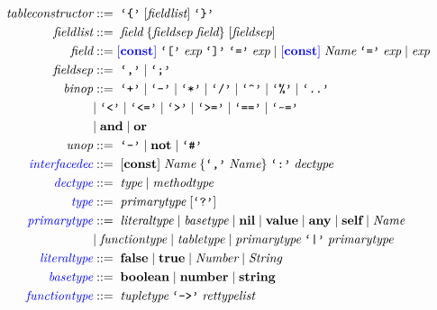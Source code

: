 \begin{align*}
\textit{tableconstructor} & ::= \; \texttt{`\{'} \; [\textit{fieldlist}] \; \texttt{`\}'}\\
\textit{fieldlist} & ::= \; \textit{field} \; \{\textit{fieldsep} \; \textit{field}\} \; [\textit{fieldsep}]\\
\textit{field} & ::= \textcolor{blue}{[\textbf{const}]} \; \texttt{`['} \; \textit{exp} \; \texttt{`]'} \; \texttt{`='} \; \textit{exp} \; | \;
  \textcolor{blue}{[\textbf{const}]} \; \textit{Name} \; \texttt{`='} \; \textit{exp} \; | \;
  \textit{exp}\\
\textit{fieldsep} & ::= \; \texttt{`,'} \; | \; \texttt{`;'}\\
\textit{binop} & ::= \; \texttt{`+'} \; | \; \texttt{`-'} \; | \; \texttt{`*'} \; | \; \texttt{`/'} \; | \;
  \texttt{`\textasciicircum'} \; | \; \texttt{`\%'} \; | \; \texttt{`..'}\\
& | \; \texttt{`<'} \; | \; \texttt{`<='} \; | \; \texttt{`>'} \; | \; \texttt{`>='} \; | \;
  \texttt{`=='} \; | \; \texttt{`\textasciitilde='}\\
& | \; \textbf{and} \; | \; \textbf{or}\\
\textit{unop} & ::= \; \texttt{`-'} \; | \; \textbf{not} \; | \; \texttt{`\#'}\\
\textcolor{blue}{\textit{interfacedec}} & ::= \; [\textbf{const}] \; \textit{Name} \; \{\texttt{`,'} \; \textit{Name}\} \; \texttt{`:'} \; \textit{dectype}\\
\textcolor{blue}{\textit{dectype}} & ::= \; \textit{type} \; | \; \textit{methodtype}\\
\textcolor{blue}{\textit{type}} & ::= \; \textit{primarytype} \; [\texttt{`?'}]\\
\textcolor{blue}{\textit{primarytype}} & ::= \; \textit{literaltype} \; | \;
  \textit{basetype} \; | \;
  \textbf{nil} \; | \;
  \textbf{value} \; | \;
  \textbf{any} \; | \;
  \textbf{self} \; | \;
  \textit{Name}\\
& | \; \textit{functiontype} \; | \;
  \textit{tabletype} \; | \;
  \textit{primarytype} \; \texttt{`|'} \; \textit{primarytype}\\
\textcolor{blue}{\textit{literaltype}} & ::= \; \textbf{false} \; | \;
  \textbf{true} \; | \;
  \textit{Number} \; | \;
  \textit{String}\\
\textcolor{blue}{\textit{basetype}} & ::= \; \textbf{boolean} \; | \;
  \textbf{number} \; | \;
  \textbf{string}\\
\textcolor{blue}{\textit{functiontype}} & ::= \; \textit{tupletype} \; \texttt{`->'} \; \textit{rettypelist}\\

\end{align*}
